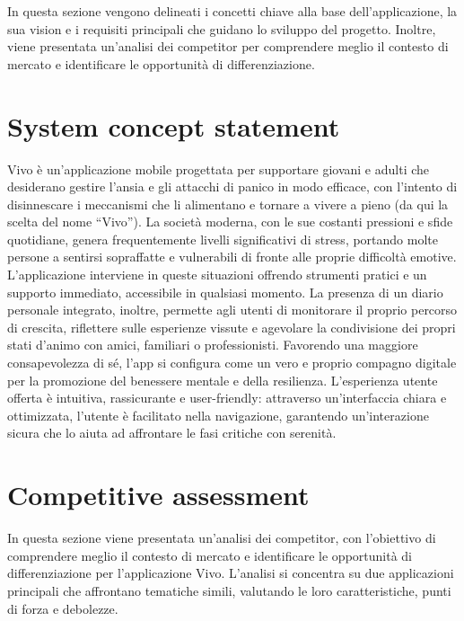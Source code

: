In questa sezione vengono delineati i concetti chiave alla base dell'applicazione, la sua vision e i requisiti principali che guidano lo sviluppo del progetto.
Inoltre, viene presentata un'analisi dei competitor per comprendere meglio il contesto di mercato e identificare le opportunità di differenziazione.

\section{System concept statement}
\label{sec:system-concept-statement}

Vivo è un'applicazione mobile progettata per supportare giovani e adulti che desiderano gestire l'ansia e gli attacchi di panico in modo efficace, con l'intento di disinnescare i meccanismi che li alimentano e tornare a vivere a pieno (da qui la scelta del nome \enquote{Vivo}).
La società moderna, con le sue costanti pressioni e sfide quotidiane, genera frequentemente livelli significativi di stress, portando molte persone a sentirsi sopraffatte e vulnerabili di fronte alle proprie difficoltà emotive.
L'applicazione interviene in queste situazioni offrendo strumenti pratici e un supporto immediato, accessibile in qualsiasi momento.
La presenza di un diario personale integrato, inoltre, permette agli utenti di monitorare il proprio percorso di crescita, riflettere sulle esperienze vissute e agevolare la condivisione dei propri stati d'animo con amici, familiari o professionisti.
Favorendo una maggiore consapevolezza di sé, l'app si configura come un vero e proprio compagno digitale per la promozione del benessere mentale e della resilienza.
L'esperienza utente offerta è intuitiva, rassicurante e user-friendly: attraverso un'interfaccia chiara e ottimizzata, l'utente è facilitato nella navigazione, garantendo un'interazione sicura che lo aiuta ad affrontare le fasi critiche con serenità.

\section{Competitive assessment}
\label{sec:competitive-assessment}

In questa sezione viene presentata un'analisi dei competitor, con l'obiettivo di comprendere meglio il contesto di mercato e identificare le opportunità di differenziazione per l'applicazione Vivo.
L'analisi si concentra su due applicazioni principali che affrontano tematiche simili, valutando le loro caratteristiche, punti di forza e debolezze.

